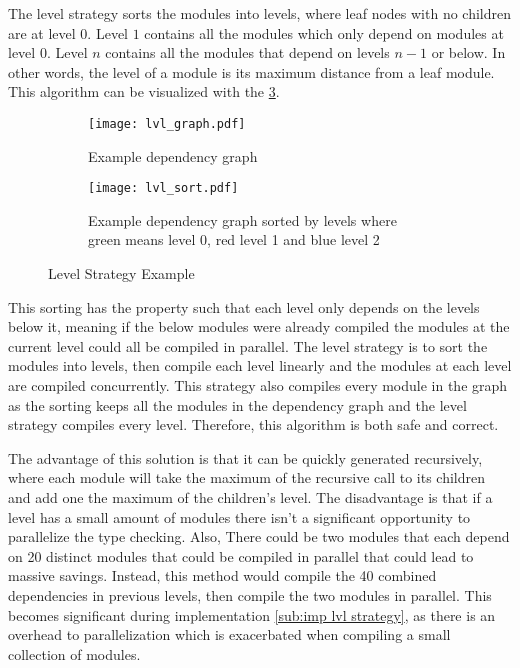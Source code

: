 The level strategy sorts the modules into levels, where leaf nodes with no
children are at level \(0\). Level \(1\) contains all the modules which only depend on
modules at level \(0\). Level \(n\) contains all the modules that depend on levels \(n
- 1\) or below. In other words, the level of a module is its maximum distance
from a leaf module. This algorithm can be visualized with the \cref{subfig: lvl strat}.
\begin{figure}[H]
  \begin{subfigure}[t]{0.45\textwidth}
    \centering
    \texttt{[image: lvl\_graph.pdf]}
    \caption{Example dependency graph}
    \label{fig:example lvl dep graph}
  \end{subfigure} \hfill
  \begin{subfigure}[t]{0.45\textwidth}
    \centering
    \texttt{[image: lvl\_sort.pdf]}
    \caption{Example dependency graph sorted by levels where green means level
    0, red level 1 and blue level 2}
    \label{fig:example lvl sort}
  \end{subfigure}
  \caption{Level Strategy Example}
  \label{subfig: lvl strat}
\end{figure}

This sorting has the property such that each level only depends on the levels
below it, meaning if the below modules were already compiled the modules at the
current level could all be compiled in parallel. The level strategy is to sort
the modules into levels, then compile each level linearly and the modules at
each level are compiled concurrently. This strategy also compiles every module
in the graph as the sorting keeps all the modules in the dependency graph and
the level strategy compiles every level. Therefore, this algorithm is both safe
and correct.


The advantage of this solution is that it can be quickly generated recursively,
where each module will take the maximum of the recursive call to its children
and add one the maximum of the children's level. The disadvantage is that if a
level has a small amount of modules there isn't a significant opportunity to
parallelize the type checking. Also, There could be two modules that each
depend  on 20 distinct modules that could be compiled in parallel that could
lead to massive savings. Instead, this method would compile the 40 combined
dependencies in previous levels, then compile the two modules in parallel. This
becomes significant during implementation \cref{sub:imp lvl strategy}, as there
is an overhead to parallelization which is exacerbated when compiling a small
collection of modules.


